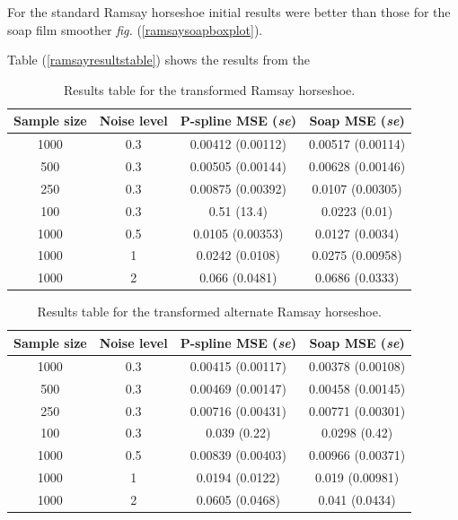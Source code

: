 \documentclass[a4paper,10pt]{amsart}
\newcommand{\fig}[1]{\emph{fig.} (\ref{#1})}
\begin{document}
For the standard Ramsay horseshoe initial results were better than those for the soap film smoother \fig{ramsaysoapboxplot}.


Table (\ref{ramsayresultstable}) shows the results from the 


\begin{table}[ht]
\begin{tabular}{c c c c}\\
Sample size & Noise level & P-spline MSE (\emph{se}) & Soap MSE (\emph{se}) \\
\hline
\hline
1000 & 0.3 & 0.00412 (0.00112) & 0.00517 (0.00114) \\ 
500 & 0.3 & 0.00505 (0.00144) & 0.00628 (0.00146) \\ 
250 & 0.3 & 0.00875 (0.00392) & 0.0107 (0.00305) \\ 
100 & 0.3 & 0.51 (13.4) & 0.0223 (0.01) \\ 
1000 & 0.5 & 0.0105 (0.00353) & 0.0127 (0.0034) \\ 
1000 & 1 & 0.0242 (0.0108) & 0.0275 (0.00958) \\ 
1000 & 2 & 0.066 (0.0481) & 0.0686 (0.0333) \\ 
\end{tabular}
\label{ramsaytresultstable}
\caption{Results table for the transformed Ramsay horseshoe.}
\end{table}


\begin{table}[ht]
\begin{tabular}{c c c c}\\
Sample size & Noise level & P-spline MSE (\emph{se}) & Soap MSE (\emph{se}) \\
\hline
\hline
1000 & 0.3 & 0.00415 (0.00117) & 0.00378 (0.00108) \\ 
500 & 0.3 & 0.00469 (0.00147) & 0.00458  (0.00145) \\ 
250 & 0.3 & 0.00716 (0.00431) & 0.00771  (0.00301) \\ 
100 & 0.3 & 0.039 (0.22) & 0.0298  (0.42) \\ 
1000 & 0.5 & 0.00839 (0.00403) & 0.00966 (0.00371) \\ 
1000 & 1 & 0.0194 (0.0122) & 0.019 (0.00981) \\ 
1000 & 2 & 0.0605 (0.0468) & 0.041 (0.0434) \\ 
\end{tabular}
\label{ramsatresultstable}
\caption{Results table for the transformed alternate Ramsay horseshoe.}
\end{table}





\end{document}
